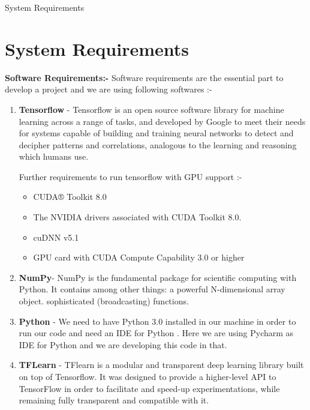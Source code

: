 \begin{center}
	{\Huge System Requirements}
\end{center}
\setcounter{section}{0}
\section{System Requirements}

\textbf{Software Requirements:-}  Software requirements are the essential part to develop a project and we are using following softwares :-

\begin{enumerate}
	\item \textbf{Tensorflow} - Tensorflow is an open source software library for machine learning across a range of tasks, and developed by Google to meet their needs for systems capable of building and training neural networks to detect and decipher patterns and correlations, analogous to the learning and reasoning which humans use.
	
	Further requirements to run tensorflow with GPU support :-
	\begin{itemize}
		\item CUDA® Toolkit 8.0
		\item The NVIDIA drivers associated with CUDA Toolkit 8.0.
		\item cuDNN v5.1
		\item GPU card with CUDA Compute Capability 3.0 or higher
	\end{itemize}

	\item \textbf{NumPy}- NumPy is the fundamental package for scientific computing with Python. It contains among other things: a powerful N-dimensional array object. sophisticated (broadcasting) functions.
	
	\item \textbf{Python} - We need to have Python 3.0 installed in our machine in order to run our code and need an IDE for Python . Here we are using Pycharm as IDE for Python and we are developing this code in that.
	
	\item \textbf{TFLearn} - TFlearn is a modular and transparent deep learning library built on top of Tensorflow. It was designed to provide a higher-level API to TensorFlow in order to facilitate and speed-up experimentations, while remaining fully transparent and compatible with it.
	

\end{enumerate}
